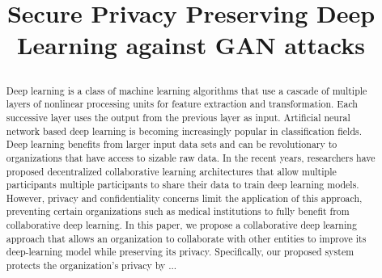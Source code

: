 \documentclass[conference]{IEEEtran}
\begin{document}
\title{{Secure Privacy Preserving Deep Learning against GAN attacks}\\
\author{
\and
{}
}
}
\maketitle

\begin{abstract}

Deep learning is a class of machine learning algorithms that use a cascade of multiple layers of nonlinear processing units for feature
extraction and transformation. Each successive layer uses the output from the previous layer as input. Artificial neural network based
deep learning is becoming increasingly popular in classification fields. Deep learning benefits from larger input data sets and can be
revolutionary to organizations that have access to sizable raw data. In
the recent years,  researchers have proposed decentralized collaborative learning architectures that allow multiple participants
multiple participants to share their data to train deep learning models. However, privacy and confidentiality concerns limit the
application of this approach, preventing certain organizations such as medical institutions to fully benefit from collaborative deep
learning. 
In this paper, we propose a collaborative deep learning approach that allows an organization to collaborate with other entities
to improve its deep-learning model while preserving its privacy. 
Specifically, our proposed system protects the organization's privacy by ...
\end{abstract}
\end{document}
